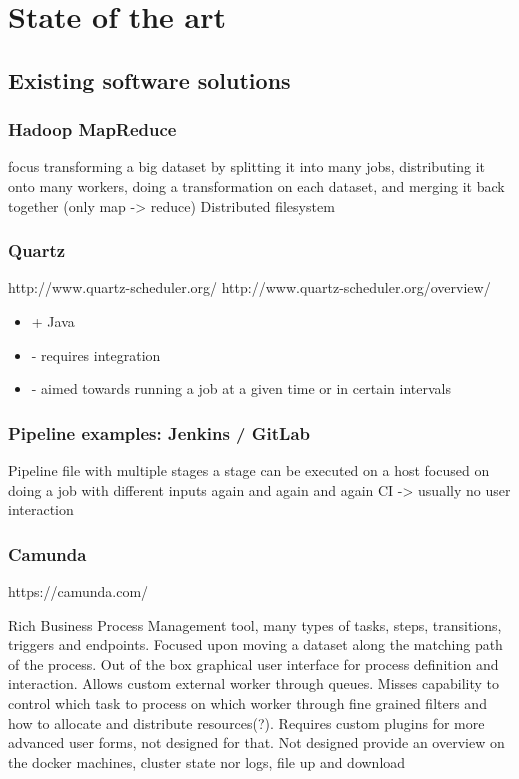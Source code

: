 \chapter{State of the art}

\section{Existing software solutions}

\subsection{Hadoop MapReduce}

focus transforming a big dataset by splitting it into many jobs, distributing it onto many workers, doing a transformation on each dataset, and merging it back together (only map -> reduce)
Distributed filesystem

\subsection{Quartz}

http://www.quartz-scheduler.org/
http://www.quartz-scheduler.org/overview/

\begin{itemize}
	\item + Java
	\item - requires integration
	\item - aimed towards running a job at a given time or in certain intervals
\end{itemize}

\subsection{Pipeline examples: Jenkins / GitLab}

Pipeline file with multiple stages
a stage can be executed on a host
focused on doing a job with different inputs again and again and again
CI -> usually no user interaction

\subsection{Camunda}

https://camunda.com/

Rich Business Process Management tool, many types of tasks, steps, transitions, triggers and endpoints.
Focused upon moving a dataset along the matching path of the process.
Out of the box graphical user interface for process definition and interaction.
Allows custom external worker through queues.
Misses capability to control which task to process on which worker through fine grained filters and how to allocate and distribute resources(?).
Requires custom plugins for more advanced user forms, not designed for that.
Not designed provide an overview on the docker machines, cluster state nor logs, file up and download

